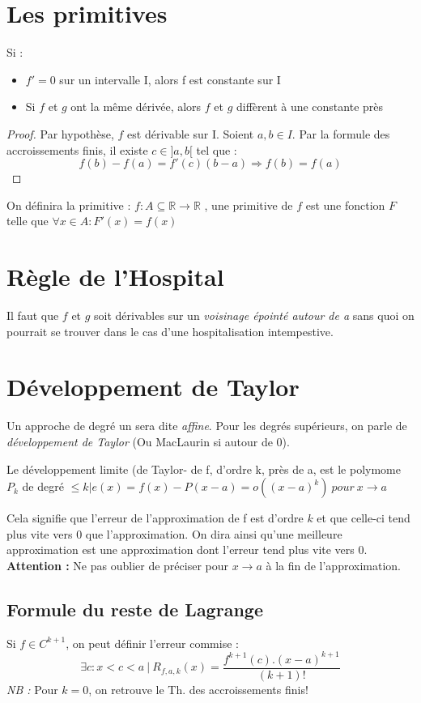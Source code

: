 \documentclass[11pt, a4paper, openany]{book}
\begin{document}
\section{Les primitives}
Si : 
\begin{itemize}
	\item $f' = 0$ sur un intervalle I, alors f est constante sur I
	\item Si $f$ et $g$ ont la même dérivée, alors $f$ et $g$ diffèrent à une constante près
\end{itemize}
\begin{proof}
	Par hypothèse, $f$ est dérivable sur I. Soient $a, b \in I$. Par la formule des accroissements finis, il existe $c \in ]a, b[$ tel que :
	$$f(b) - f(a) = f'(c)(b-a) \Rightarrow f(b) = f(a)$$
\end{proof}
On définira la primitive : $f:A \subseteq \mathbb{R} \rightarrow \mathbb{R}$ , une primitive de $f$ est une fonction $F$ telle que $\forall x \in A : F'(x) = f(x)$

\section{Règle de l'Hospital}
Il faut que $f$ et $g$ soit dérivables sur un \textit{voisinage épointé autour de a} sans quoi on pourrait se trouver dans le cas d'une hospitalisation intempestive.

\section{Développement de Taylor}
Un approche de degré un sera dite \textit{affine}. Pour les degrés supérieurs, on parle de \textit{développement de Taylor} (Ou MacLaurin si autour de 0).
\begin{center}
	Le développement limite (de Taylor- de f, d'ordre k, près de a, est le polymome $P_{k}$ de degré $\leq k | e(x) = f(x) - P(x-a) = o((x-a)^{k})\ pour\ x \rightarrow a$
\end{center}
Cela signifie que l'erreur de l'approximation de f est d'ordre $k$ et que celle-ci tend plus vite vers 0 que l'approximation. On dira ainsi qu'une meilleure approximation est une approximation dont l'erreur tend plus vite vers 0.\\
\textbf{Attention :} Ne pas oublier de préciser pour $x \rightarrow a$ à la fin de l'approximation.

\subsection{Formule du reste de Lagrange}
Si $f \in C^{k+1}$, on peut définir l'erreur commise :
$$\exists c : x < c < a\ |\ R_{f, a, k}(x) = \frac{f^{k+1}(c) . (x-a)^{k+1}}{(k+1)!}$$
\textit{NB : } Pour $k=0$, on retrouve le Th. des accroissements finis!\\\\
\end{document}

